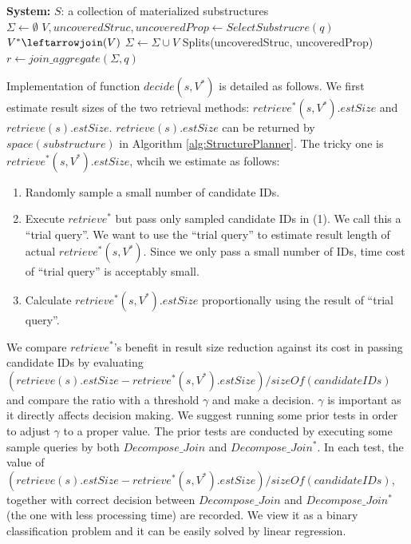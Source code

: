 \begin{algorithm}[H]
\caption{$Decompose\_Join^{+}$}
\LinesNumbered
\textbf{System:} $S$: a collection of materialized substructures\\
$\Sigma \gets \emptyset $\;
$V, uncoveredStruc, uncoveredProp \gets SelectSubstrucre(q) $\;
$V^{*}\leftarrowjoin(V)$\;
$\Sigma \gets \Sigma \cup V $\;
Splits\leftarrowsplit(uncoveredStruc, uncoveredProp)\;
$r \leftarrow join\_aggregate(\Sigma, q)$\;
\end{algorithm}

Implementation of function $decide(s,V^{*})$ is detailed as follows. We first estimate result sizes of the two retrieval methods: $retrieve^{*}(s, V^{*}).estSize$ and $retrieve(s).estSize$. $retrieve(s).estSize$ can be returned by $space(substructure)$ in Algorithm \ref{alg:StructurePlanner}. The tricky one is $retrieve^{*}(s, V^{*}).estSize$, whcih we estimate as follows:
\begin{enumerate}
\item  Randomly sample a small number of candidate IDs.

\item  Execute $retrieve^{*}$ but pass only sampled candidate IDs in (1). We call this a ``trial query''. We want to use the ``trial query'' to estimate result length of actual $retrieve^{*}(s, V^{*})$. Since we only pass a small number of IDs, time cost of ``trial query'' is acceptably small.

\item  Calculate $retrieve^{*}(s, V^{*}).estSize$ proportionally using the result of ``trial query''.
\end{enumerate}
\par
We compare $retrieve^{*}$'s benefit in result size reduction against its cost in passing candidate IDs by evaluating $(retrieve(s).estSize - retrieve^{*}(s, V^{*}).estSize) / sizeOf(candidateIDs)$ and compare the ratio with a threshold $\gamma$ and make a decision. $\gamma$ is important as it directly affects decision making. We suggest running some prior tests in order to adjust $\gamma$ to a proper value. The prior tests are conducted by executing some sample queries by both $Decompose\_Join$ and $Decompose\_Join^{*}$. In each test, the value of $(retrieve(s).estSize - retrieve^{*}(s, V^{*}).estSize) / sizeOf(candidateIDs)$, together with correct decision between $Decompose\_Join$ and $Decompose\_Join^{*}$ (the one with less processing time) are recorded. We view it as a binary classification problem and  it can be easily solved by linear regression.   

